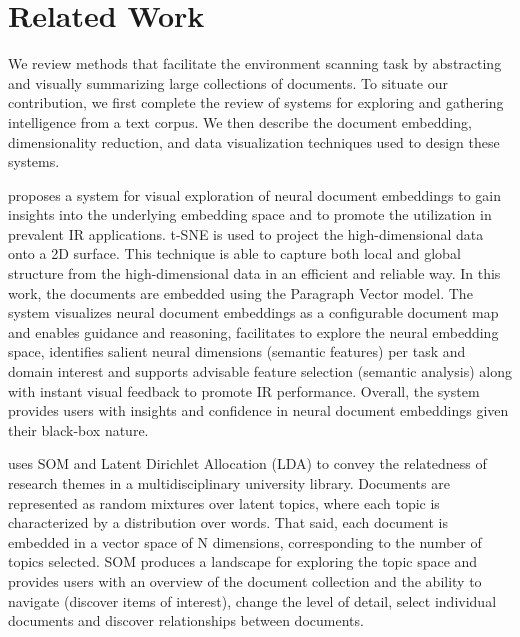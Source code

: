 \documentclass[a4paper]{article}
\begin{document}

\section*{Related Work}
We review methods that facilitate the environment scanning task by abstracting and visually summarizing large collections of documents. To situate our contribution, we first complete the review of systems for exploring and gathering intelligence from a text corpus. We then describe the document embedding, dimensionality reduction, and data visualization techniques used to design these systems. 

\citet{ji2019} proposes a system for visual exploration of neural document embeddings to gain insights into the underlying embedding space and to promote the utilization in prevalent IR applications. t-SNE is used to project the high-dimensional data onto a 2D surface. This technique is able to capture both local and global structure from the high-dimensional data in an efficient and reliable way. In this work, the documents are embedded using the Paragraph Vector model. The system visualizes neural document embeddings as a configurable document map and enables guidance and reasoning, facilitates to explore the neural embedding space, identifies salient neural dimensions (semantic features) per task and domain interest and supports advisable feature selection (semantic analysis) along with instant visual feedback to promote IR performance. Overall, the system provides users with insights and confidence in neural document embeddings given their black-box nature.

\citet{lafia2019} uses SOM and Latent Dirichlet Allocation (LDA) to convey the relatedness of research themes in a multidisciplinary university library. Documents are represented as random mixtures over latent topics, where each topic is characterized by a distribution over words. That said, each document is embedded in a vector space of N dimensions, corresponding to the number of topics selected. SOM produces a landscape for exploring the topic space and provides users with an overview of the document collection and the ability to navigate (discover items of interest), change the level of detail, select individual documents and discover relationships between documents.
\end{document}
